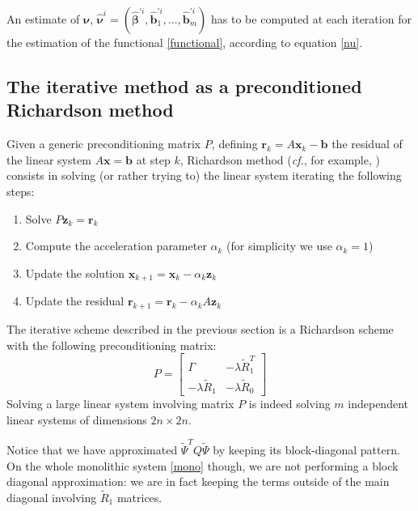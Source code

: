 An estimate of $\bm{\nu}$, $\hat{\bm{\nu}}^i = (\hat{\bm{\beta}}^{\prime i},
	\hat{\bm{b}}_1^{\prime i}, \dots, \hat{\bm{b}}_m^{\prime i})$ has to be
computed at each iteration for the estimation of the functional
\ref{functional}, according to equation \ref{nu}.

\subsection{The iterative method as a preconditioned Richardson method}
Given a generic preconditioning matrix $P$, defining $\bm{r}_k=A \bm{x}_k -
	\bm{b}$ the residual of the linear system $A \bm{x} = \bm{b}$ at step $k$,
Richardson method (\textit{cf.}, for example, \cite{Quarteroni}) consists in
solving (or rather trying to) the linear system iterating the following steps:
\begin{enumerate}
	\item Solve $P \bm{z}_k = \bm{r}_k$
	\item Compute the acceleration parameter $\alpha_k$ (for simplicity we use $\alpha_k = 1$)
	\item Update the solution $ \bm{x}_{k+1} = \bm{x}_{k} - \alpha_k \bm{z}_k $
	\item Update the residual $\bm{r}_{k+1} = \bm{r}_{k} - \alpha_k A \bm{z}_k$
\end{enumerate}

The iterative scheme described in the previous section is a Richardson scheme
with the following preconditioning matrix:
\begin{equation}
	\label{precond}
	P=
	\begin{bmatrix}
		\Gamma               & -\lambda \tilde{R}_1^T \\
		-\lambda \tilde{R}_1 & -\lambda \tilde{R}_0
	\end{bmatrix}
\end{equation}
Solving a large linear system involving matrix $P$ is indeed solving
$m$ independent linear systems of dimensions $2n\times 2n$.

Notice that we have approximated $\tilde{\Psi}^TQ\tilde{\Psi}$ by keeping its
block-diagonal pattern. On the whole monolithic system \ref{mono} though, we
are not performing a block diagonal approximation: we are in fact keeping the
terms outside of the main diagonal involving $\tilde{R}_1$ matrices.

